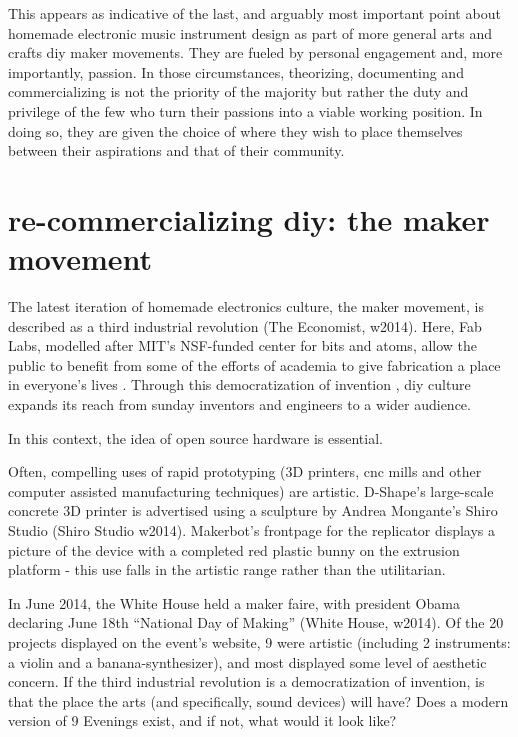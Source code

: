 \begin{itemize}
This appears as indicative of the last, and arguably most important point about homemade electronic music instrument design as part of more general arts and crafts \/ diy \/ maker movements. They are fueled by personal engagement and, more importantly, passion. In those circumstances, theorizing, documenting and commercializing is not the priority of the majority but rather the duty and privilege of the few who turn their passions into a viable working position. In doing so, they are given the choice of where they wish to place themselves between their aspirations and that of their community. 

\section{re-commercializing diy: the maker movement}  

The latest iteration of homemade electronics culture, the maker movement, is described as a third industrial revolution (The Economist, w2014). Here, Fab Labs, modelled after MIT’s NSF-funded center for bits and atoms, allow the public to benefit from some of the efforts of academia to give fabrication a place in everyone’s lives \cite{padfield2014,blikstein2013}. Through this democratization of invention \cite{blikstein2013}, diy culture expands its reach from sunday inventors and engineers to a wider audience. 

In this context, the idea of open source hardware is essential. 

	Often, compelling uses of rapid prototyping (3D printers, cnc mills and other computer assisted manufacturing techniques) are artistic. D-Shape’s large-scale concrete 3D printer is advertised using a sculpture by Andrea Mongante’s Shiro Studio (Shiro Studio w2014). Makerbot’s frontpage for the replicator displays a picture of the device with a completed red plastic bunny on the extrusion platform - this use falls in the artistic range rather than the utilitarian. 

In June 2014, the White House held a maker faire, with president Obama declaring June 18th “National Day of Making” (White House, w2014). Of the 20 projects displayed on the event’s website, 9 were artistic (including 2 instruments: a violin and a banana-synthesizer), and most displayed some level of aesthetic concern. If the third industrial revolution is a democratization of invention, is that the place the arts (and specifically, sound devices) will have? Does a modern version of 9 Evenings exist, and if not, what would it look like? 


\end{itemize}
